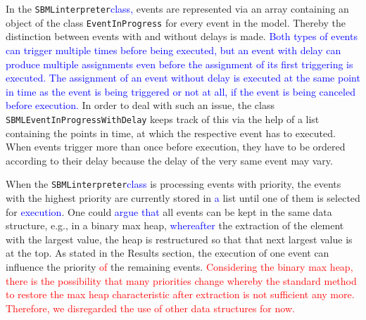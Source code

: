 \documentclass[10pt]{bmc_article}
\newenvironment{bmcformat}{\fussy\setboolean{publ}{true}}{\fussy}
\newcommand{\TODO}[1]{\textcolor{red}{#1}}
\newcommand{\COR}[1]{\textcolor{blue}{#1}}
\newcommand{\SBMLinterpreter}{\texttt{SBML\-interpreter}\xspace}
\newcommand{\EventInProgress}{\texttt{Event\-In\-Progress}\xspace}
\newcommand{\SBMLEventInProgressWithDelay}{\texttt{SBML\-Event\-In\-Progress\-With\-Delay}\xspace}
\begin{document}
\begin{bmcformat}
In the \SBMLinterpreter \COR{class,} events are represented via an array containing an object of the class \EventInProgress for every event in the model.
Thereby the distinction between events with and without delays is made.
\COR{Both types of events can trigger multiple times before being executed, but an event with delay can produce multiple assignments even before the assignment of its first triggering is executed. The assignment of an event without delay is executed at the same point in time as the event is being triggered or not at all, if the event is being canceled before execution.}
In order to deal with such an issue, the class \SBMLEventInProgressWithDelay keeps track of this via the help of a list containing the points in time, at which the respective event has to executed. When events trigger more than once before execution, they have to be ordered according to their delay because the delay of the very same event may vary.

When the \SBMLinterpreter \COR{class} is processing events with priority, the events with the highest priority are currently stored in \COR{a} list until one of them is selected for \COR{execution}.
One could \COR{argue that} all events can be kept in the same data structure, e.g., in a binary max heap, \COR{whereafter} the extraction of the element with the largest value, the heap is restructured so that that next largest value is at the top.
As stated in the Results section, the execution of one event can influence the priority \TODO{of} the remaining events.
\TODO{Considering the binary max heap, there is the possibility that many priorities change whereby the standard method to restore the max heap characteristic after extraction is not sufficient any more. Therefore, we disregarded the use of other data structures for now.}


\end{bmcformat}
\end{document}
